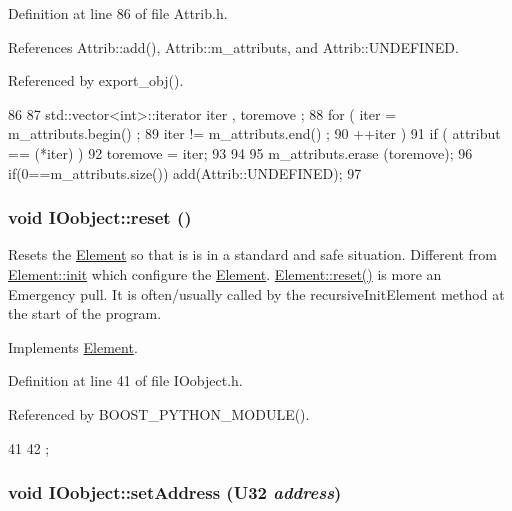 Definition at line 86 of file Attrib.h.

References Attrib::add(), Attrib::m\_\-attributs, and Attrib::UNDEFINED.

Referenced by export\_\-obj().


\begin{DoxyCode}
86                                {
87     std::vector<int>::iterator iter , toremove ;
88     for ( iter  = m_attributs.begin() ;
89           iter != m_attributs.end()   ;
90           ++iter ) {
91       if ( attribut == (*iter) ) {
92         toremove = iter;
93       }
94     }
95     m_attributs.erase (toremove);
96     if(0==m_attributs.size()) add(Attrib::UNDEFINED);
97   }
\end{DoxyCode}
\hypertarget{classIOobject_abccbc7a65366ec1257ff41a8e3245af8}{
\subsubsection[{reset}]{\setlength{\rightskip}{0pt plus 5cm}void IOobject::reset ()}}
\label{classIOobject_abccbc7a65366ec1257ff41a8e3245af8}
Resets the \hyperlink{classElement}{Element} so that is is in a standard and safe situation. Different from \hyperlink{classElement_af42754b5cabc198869222725218d695c}{Element::init} which configure the \hyperlink{classElement}{Element}. \hyperlink{classElement_a69efffa22f06909d768149715565cb56}{Element::reset()} is more an Emergency pull. It is often/usually called by the recursiveInitElement method at the start of the program. 

Implements \hyperlink{classElement_a69efffa22f06909d768149715565cb56}{Element}.

Definition at line 41 of file IOobject.h.

Referenced by BOOST\_\-PYTHON\_\-MODULE().


\begin{DoxyCode}
41                {
42   };
\end{DoxyCode}
\hypertarget{classIOobject_ae0d372aaeafe3da3c239677118deb2ac}{
\subsubsection[{setAddress}]{\setlength{\rightskip}{0pt plus 5cm}void IOobject::setAddress ({\bf U32} {\em address})}}
\label{classIOobject_ae0d372aaeafe3da3c239677118deb2ac}


